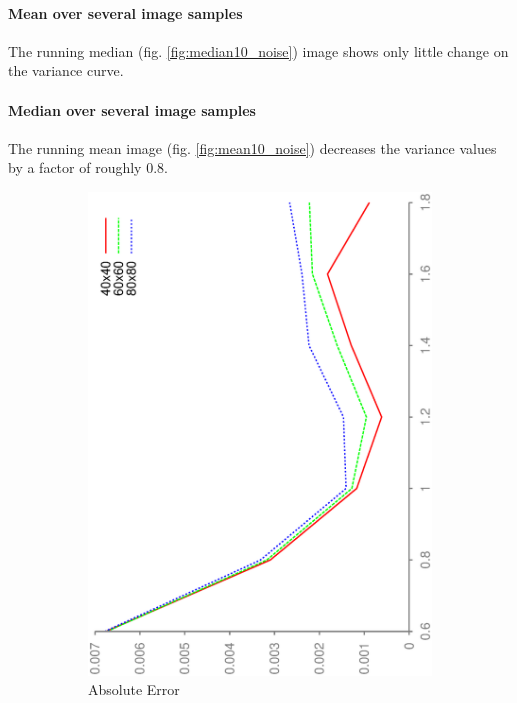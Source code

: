 \documentclass[DIV12,a4paper]{scrartcl}
\begin{document}
\paragraph{Mean over several image samples} The running median (fig. \ref{fig:median10_noise}) image shows only little change on the variance curve.

\paragraph{Median over several image samples} The running mean image (fig. \ref{fig:mean10_noise}) decreases the variance values by a factor of roughly $0.8$.

\begin{figure}[h!tbp]
  \centering
  \begin{subfigure}[b]{.5\textwidth}
    \centering
    \includegraphics[height=\textwidth, angle=270]{figures/mean_gauss_error.eps}
    \caption{Absolute Error}
  \end{subfigure}%
  \begin{subfigure}[b]{.5\textwidth}
    \centering

\end{subfigure}
\end{figure}
\end{document}
